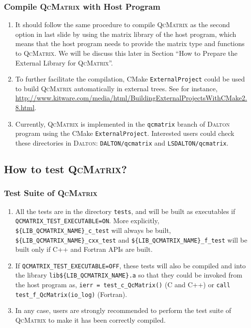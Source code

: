 \documentclass[10pt]{beamer}
\begin{document}
{{\begin{frame}[fragile]
  \frametitle<presentation>{Compile \textsc{QcMatrix} with Host Program}
  \begin{enumerate}
    \item It should follow the same procedure to compile \textsc{QcMatrix} as the second
      option in last slide by using the matrix library of the host program, which means
      that the host program needs to provide the matrix type and functions to \textsc{QcMatrix}.
      We will be discuss this later in Section ``How to Prepare the External Library for
      \textsc{QcMatrix}''.
    \item To further facilitate the compilation, CMake \verb|ExternalProject| could be
      used to build \textsc{QcMatrix} automatically in external trees. See for instance,
      \url{http://www.kitware.com/media/html/BuildingExternalProjectsWithCMake2.8.html}.
    \item Currently, \textsc{QcMatrix} is implemented in the \verb|qcmatrix| branch of
      \textsc{Dalton} program using the CMake \verb|ExternalProject|. Interested users
      could check these directories in \textsc{Dalton}: \verb|DALTON/qcmatrix| and
      \verb|LSDALTON/qcmatrix|.
  \end{enumerate}
\end{frame}

\subsection{How to test \textsc{QcMatrix}?}
\label{section-how-to-test}

\begin{frame}[fragile]
  \frametitle<presentation>{Test Suite of \textsc{QcMatrix}}
  \begin{enumerate}
    \item All the tests are in the directory \verb|tests|, and will be built as
      executables if \verb|QCMATRIX_TEST_EXECUTABLE=ON|. More explicitly,
      \verb|${LIB_QCMATRIX_NAME}_c_test| will always be built,
      \verb|${LIB_QCMATRIX_NAME}_cxx_test| and \verb|${LIB_QCMATRIX_NAME}_f_test|
      will be built only if C++ and Fortran APIs are built.
    \item If \verb|QCMATRIX_TEST_EXECUTABLE=OFF|, these tests will also be compiled
      and into the library \verb|lib${LIB_QCMATRIX_NAME}.a| so that they could be
      invoked from the host program as, \verb|ierr = test_c_QcMatrix()| (C and C++)
      or \verb|call test_f_QcMatrix(io_log)| (Fortran).
    \item In any case, users are strongly recommended to perform the test suite of
      \textsc{QcMatrix} to make it has been correctly compiled.
  \end{enumerate}
\end{frame}

}}
\end{document}
